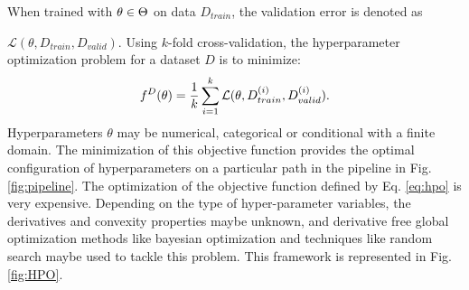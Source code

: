 When trained with $\emph{$\theta$} \in \textbf{$\Theta$}$ on data $D_{train}$, the validation error is denoted as \par
\noindent $\mathcal{L}(\theta, D_{train}, D_{valid})$. Using $k$-fold cross-validation, the hyperparameter optimization problem for a dataset $D$ is to minimize:
\begin{equation}
f^D(\theta) = \frac{1}{k}\sum_{i=1}^{k} \mathcal{L}(\emph{$\theta$}, D_{train}^{(i)}, D_{valid}^{(i)}).
\label{eq:hpo}
\end{equation}
Hyperparameters $\theta$ may be numerical, categorical or conditional with a finite domain. The minimization of this objective function provides the optimal configuration of hyperparameters on a particular path in the pipeline in Fig. \ref{fig:pipeline}. The optimization of the objective function defined by Eq. \ref{eq:hpo} is very expensive. Depending on the type of hyper-parameter variables, the derivatives and convexity properties maybe unknown, and derivative free global optimization methods like bayesian optimization and techniques like random search maybe used to tackle this problem. This framework is represented in Fig. \ref{fig:HPO}.


